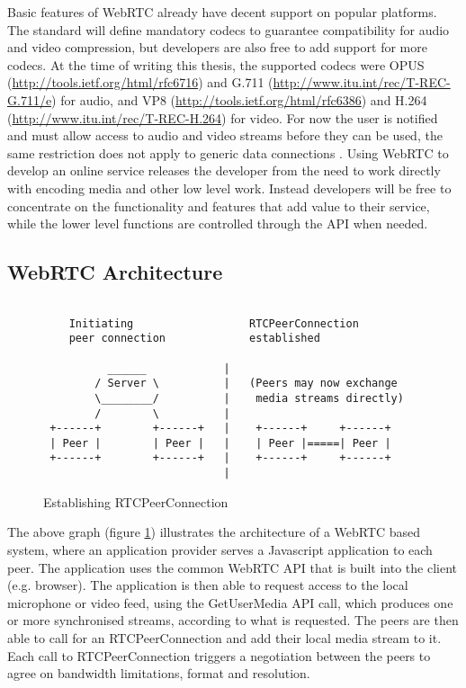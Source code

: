 \documentclass[english,12pt,a4paper,pdftex]{article}
\begin{document}
Basic features of WebRTC already have decent support on popular platforms. The standard will define mandatory codecs to guarantee compatibility for audio and video compression, but developers are also free to add support for more codecs. At the time of writing this thesis, the supported codecs were OPUS (\url{http://tools.ietf.org/html/rfc6716}) and G.711 (\url{http://www.itu.int/rec/T-REC-G.711/e}) for audio, and VP8 (\url{http://tools.ietf.org/html/rfc6386}) and H.264 (\url{http://www.itu.int/rec/T-REC-H.264}) for video. \cite{Jennings} For now the user is notified and must allow access to audio and video streams before they can be used, the same restriction does not apply to generic data connections \cite{Johnston}. Using WebRTC to develop an online service releases the developer from the need to work directly with encoding media and other low level work. Instead developers will be free to concentrate on the functionality and features that add value to their service, while the lower level functions are controlled through the API when needed.

\subsection{WebRTC Architecture}

\begin{figure}[H]
\begin{verbatim}

    Initiating                  RTCPeerConnection
    peer connection             established
    
          ______            |
        / Server \          |   (Peers may now exchange 
        \________/          |    media streams directly)
        /        \          |
 +------+        +------+   |    +------+     +------+
 | Peer |        | Peer |   |    | Peer |=====| Peer |
 +------+        +------+   |    +------+     +------+
                            |
\end{verbatim}
\caption{Establishing RTCPeerConnection}
\label{fig:peer-connection}
\end{figure}

The above graph (figure \ref{fig:peer-connection}) illustrates the architecture of a WebRTC based system, where an application provider serves a Javascript application to each peer. The application uses the common WebRTC API that is built into the client (e.g. browser). The application is then able to request access to the local microphone or video feed, using the GetUserMedia API call, which produces one or more synchronised streams, according to what is requested. The peers are then able to call for an RTCPeerConnection and add their local media stream to it. Each call to RTCPeerConnection triggers a negotiation between the peers to agree on bandwidth limitations, format and resolution. \cite{Jennings, Garaizar}
\end{document}
